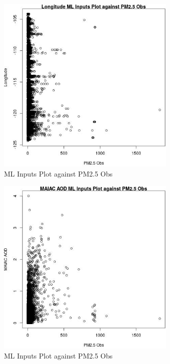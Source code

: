 \begin{figure} 
\centering  
\includegraphics[width=0.77\textwidth]{Code_Outputs/Report_ML_input_PM25_Step4_part_e_de_duplicated_aves_LongitudevPM25_Obs.jpg} 
\caption{\label{fig:Report_ML_input_PM25_Step4_part_e_de_duplicated_avesLongitudevPM25_Obs}ML Inputs Plot against PM2.5 Obs} 
\end{figure} 
 

\begin{figure} 
\centering  
\includegraphics[width=0.77\textwidth]{Code_Outputs/Report_ML_input_PM25_Step4_part_e_de_duplicated_aves_MAIAC_AODvPM25_Obs.jpg} 
\caption{\label{fig:Report_ML_input_PM25_Step4_part_e_de_duplicated_avesMAIAC_AODvPM25_Obs}ML Inputs Plot against PM2.5 Obs} 
\end{figure} 
 
